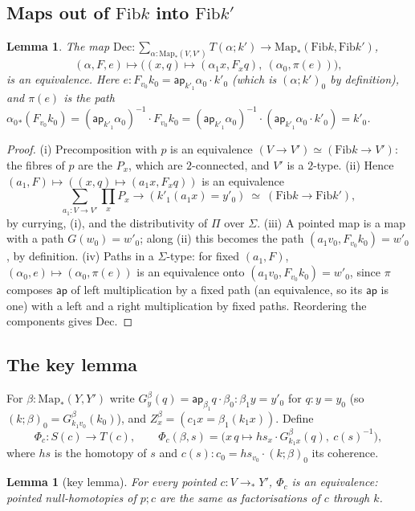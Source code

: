 \documentclass[11pt]{amsart}
\newtheorem{lemma}[theorem]{Lemma}
\theoremstyle{definition}
\theoremstyle{remark}
\newcommand{\ap}{\mathsf{ap}}
\newcommand{\Fib}{\mathrm{Fib}}
\newcommand{\Map}{\mathrm{Map}_*}
\newcommand{\cmp}{\mathbin{;}}
\begin{document}
\subsection{Maps out of $\Fib k$ into $\Fib k'$}

\begin{lemma}\label{lem:dec}
The map $\mathrm{Dec}:\sum_{\alpha:\Map(V,V')}T(\alpha\cmp k')\to\Map(\Fib k,\Fib k')$,
\[(\alpha,F,e)\longmapsto\big((x,q)\mapsto(\alpha_1x,F_xq),\ (\alpha_0,\pi(e))\big),\]
is an equivalence. Here $e:F_{v_0}k_0=\ap_{k'_1}\alpha_0\cdot k'_0$ (which is
$(\alpha\cmp k')_0$ by definition), and $\pi(e)$ is the path
$\alpha_0{}_*(F_{v_0}k_0)=(\ap_{k'_1}\alpha_0)^{-1}\cdot F_{v_0}k_0=(\ap_{k'_1}\alpha_0)^{-1}\cdot(\ap_{k'_1}\alpha_0\cdot k'_0)=k'_0$.
\end{lemma}
\begin{proof}
(i) Precomposition with $p$ is an equivalence $(V\to V')\simeq(\Fib k\to V')$:
the fibres of $p$ are the $P_x$, which are $2$-connected, and $V'$ is a
$2$-type.
(ii) Hence $(a_1,F)\mapsto((x,q)\mapsto(a_1x,F_xq))$ is an equivalence
\[\textstyle\sum_{a_1:V\to V'}\prod_x P_x\to(k'_1(a_1x)=y'_0)\ \simeq\ (\Fib k\to\Fib k'),\]
by currying, (i), and the distributivity of $\Pi$ over $\Sigma$.
(iii) A pointed map is a map with a path $G(w_0)=w'_0$; along (ii) this becomes
the path $(a_1v_0,F_{v_0}k_0)=w'_0$, by definition.
(iv) Paths in a $\Sigma$-type: for fixed $(a_1,F)$,
$(\alpha_0,e)\mapsto(\alpha_0,\pi(e))$ is an equivalence onto
$(a_1v_0,F_{v_0}k_0)=w'_0$, since $\pi$ composes $\ap$ of left multiplication by a
fixed path (an equivalence, so its $\ap$ is one) with a left and a right
multiplication by fixed paths.
Reordering the components gives $\mathrm{Dec}$.
\end{proof}

\subsection{The key lemma}

For $\beta:\Map(Y,Y')$ write $G^\beta_y(q)=\ap_{\beta_1}q\cdot\beta_0:\beta_1y=y'_0$
for $q:y=y_0$ (so $(k\cmp\beta)_0=G^\beta_{k_1v_0}(k_0)$), and
$Z^\beta_x=(c_1x=\beta_1(k_1x))$. Define
\[\Phi_c:S(c)\to T(c),\qquad \Phi_c(\beta,s)=\big(x\,q\mapsto hs_x\cdot G^\beta_{k_1x}(q),\ c(s)^{-1}\big),\]
where $hs$ is the homotopy of $s$ and $c(s):c_0=hs_{v_0}\cdot(k\cmp\beta)_0$ its
coherence.

\begin{lemma}[key lemma]\label{lem:key}
For every pointed $c:V\to_*Y'$, $\Phi_c$ is an equivalence: pointed
null-homotopies of $p\cmp c$ are the same as factorisations of $c$ through $k$.
\end{lemma}
\end{document}
